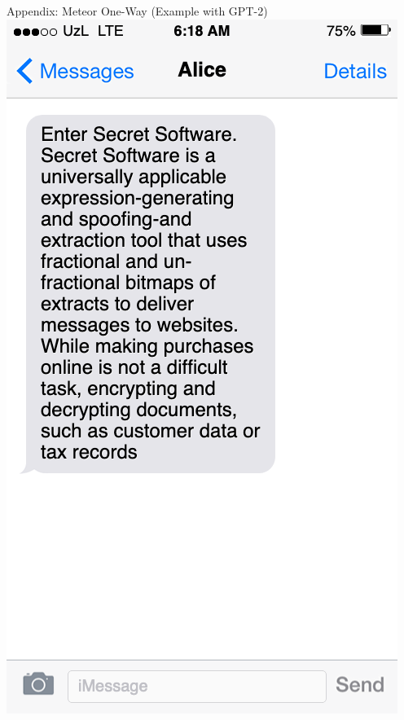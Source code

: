 \documentclass[10pt]{beamer}
\begin{document}
\begin{frame}{Appendix: Meteor One-Way (Example with GPT-2)}
	\centering
	\includegraphics[height=0.9\textheight]{twoway_no_split.png}
\end{frame}
\end{document}
